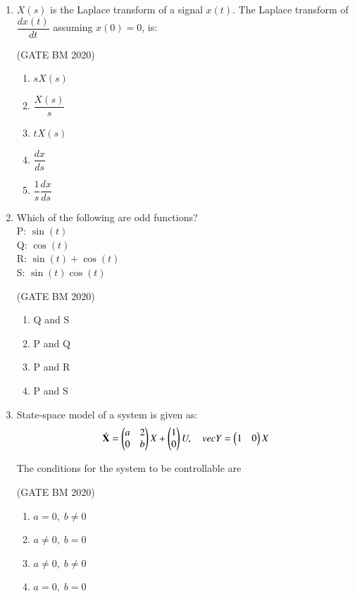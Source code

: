 \documentclass[journal]{IEEEtran}
\begin{document}
\begin{enumerate}
\item $X(s)$ is the Laplace transform of a signal $x(t)$. The Laplace transform of 
$\dfrac{dx(t)}{dt}$ assuming $x(0)=0$, is:

\hfill(GATE BM 2020)
\begin{multicols}{4}
\begin{enumerate}
\item $sX(s)$
\item $\dfrac{X(s)}{s}$
\item $tX(s)$
\item $\dfrac{dx}{ds}$
\item $\dfrac{1}{s}\dfrac{dx}{ds}$
\end{enumerate}
\end{multicols}


\item Which of the following are odd functions? \\[4pt]
P: $\sin(t)$ \\
Q: $\cos(t)$ \\
R: $\sin(t)+\cos(t)$ \\
S: $\sin(t)\cos(t)$


\hfill(GATE BM 2020)
\begin{multicols}{4}
\begin{enumerate}
\item Q and S
\item P and Q
\item P and R
\item P and S
\end{enumerate}
\end{multicols}

\item State-space model of a system is given as:
\[
	\mathbf{\dot{X}} = 
\begin{pmatrix}
a & 2 \\
0 & b
\end{pmatrix}X +
\begin{pmatrix}
1 \\
0
\end{pmatrix}U,
\quad
vec{Y}= \begin{pmatrix}1 & 0\end{pmatrix}X
\]

The conditions for the system to be controllable are


\hfill(GATE BM 2020)
\begin{multicols}{4}
\begin{enumerate}
    \item $a=0, \; b \ne 0$
    \item $a \ne 0, \; b=0$
    \item $a \ne 0, \; b \ne 0$
    \item $a=0, \; b=0$
\end{enumerate}
\end{multicols}


\end{enumerate}
\end{document}
